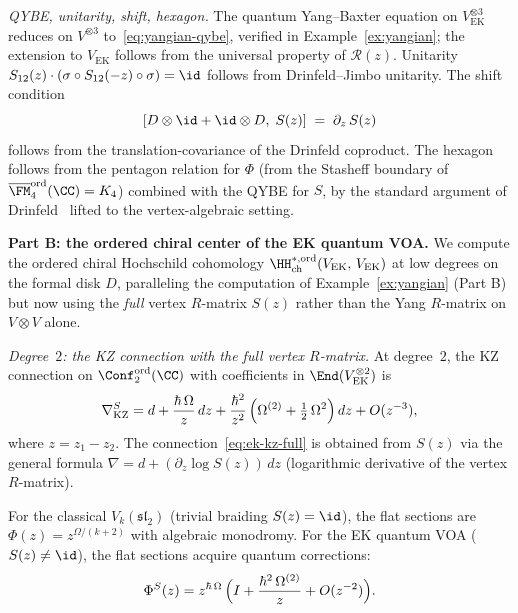 \noindent\emph{QYBE, unitarity, shift, hexagon.}
The quantum Yang--Baxter equation on
$V_{\mathrm{EK}}^{\otimes 3}$ reduces on $V^{\otimes 3}$
to~\eqref{eq:yangian-qybe}, verified in
Example~\ref{ex:yangian}; the extension to
$V_{\mathrm{EK}}$ follows from the universal property of
$\mathcal{R}(z)$.
Unitarity $S_{12}(z) \cdot (\sigma \circ S_{12}(-z)
\circ \sigma) = \id$ follows from Drinfeld--Jimbo unitarity.
The shift condition
\begin{equation}\label{eq:ek-shift-cond}
  [D \otimes \id + \id \otimes D,\; S(z)]
  \;=\; \partial_z\, S(z)
\end{equation}
follows from the translation-covariance of the Drinfeld
coproduct. The hexagon follows from the pentagon relation
for $\Phi$ (from the Stasheff boundary of
$\overline{\FM}_4^{\mathrm{ord}}(\CC) = K_4$) combined
with the QYBE for $S$, by the standard argument of
Drinfeld~\cite{EK96} lifted to the vertex-algebraic setting.

\medskip
\noindent
\textbf{Part B: the ordered chiral center of the EK quantum
VOA.}
We compute the ordered chiral Hochschild cohomology
$\HH^{*,\mathrm{ord}}_{\mathrm{ch}}
(V_{\mathrm{EK}},\,V_{\mathrm{EK}})$
at low degrees on the formal disk $D$, paralleling the
computation of Example~\ref{ex:yangian} (Part B) but now
using the \emph{full} vertex $R$-matrix $S(z)$ rather than
the Yang $R$-matrix on $V \otimes V$ alone.

\smallskip
\noindent\emph{Degree~$2$: the KZ connection with the full
vertex $R$-matrix.}
At degree~$2$, the KZ connection on
$\Conf_2^{\mathrm{ord}}(\CC)$ with coefficients in
$\End(V_{\mathrm{EK}}^{\otimes 2})$ is
\begin{equation}\label{eq:ek-kz-full}
  \nabla_{\mathrm{KZ}}^S
  = d + \frac{\hbar\,\Omega}{z}\,dz
  + \frac{\hbar^2}{z^2}\,
  \Bigl(\Omega^{(2)} + \tfrac{1}{2}\,\Omega^2\Bigr)\,dz
  + O(z^{-3}),
\end{equation}
where $z = z_1 - z_2$. The connection~\eqref{eq:ek-kz-full}
is obtained from $S(z)$ via the general formula
$\nabla = d + (\partial_z \log S(z))\,dz$ (logarithmic
derivative of the vertex $R$-matrix).

For the classical $V_k(\mathfrak{sl}_2)$ (trivial braiding
$S(z) = \id$), the flat sections are
$\Phi(z) = z^{\Omega/(k+2)}$ with algebraic monodromy.
For the EK quantum VOA ($S(z) \neq \id$), the flat sections
acquire quantum corrections:
\begin{equation}\label{eq:ek-flat-sections}
  \Phi^S(z)
  = z^{\hbar\,\Omega}\,
  \Bigl(I + \frac{\hbar^2\,\Omega^{(2)}}{z}
  + O(z^{-2})\Bigr).
\end{equation}

